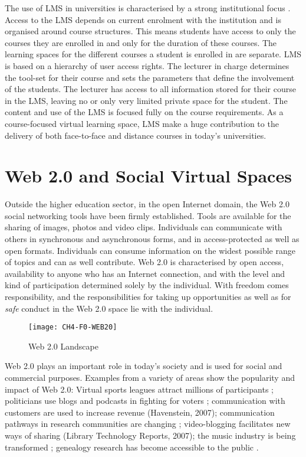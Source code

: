 The use of LMS in universities is characterised by a strong institutional focus
\citep{Siemens2004}. Access to the LMS depends on current enrolment with the
institution and is organised around course structures. This means students have
access to only the courses they are enrolled in and only for the duration of
these courses. The learning spaces for the different courses a student is
enrolled in are separate. LMS is based on a hierarchy of user access rights. The
lecturer in charge determines the tool-set for their course and sets the
parameters that define the involvement of the students. The lecturer has access
to all information stored for their course in the LMS, leaving no or only very
limited private space for the student. The content and use of the LMS is focused
fully on the course requirements. As a course-focused virtual learning space,
LMS make a huge contribution to the delivery of both face-to-face and distance
courses in today's universities.

\section{Web 2.0 and Social Virtual Spaces}
Outside the higher education sector, in the open Internet domain, the Web 2.0
social networking tools have been firmly established. Tools are available for
the sharing of images, photos and video clips. Individuals can communicate with
others in synchronous and asynchronous forms, and in access-protected as well as
open formats. Individuals can consume information on the widest possible range
of topics and can as well contribute. Web 2.0 is characterised by open access,
availability to anyone who has an Internet connection, and with the level and
kind of participation determined solely by the individual. With freedom comes
responsibility, and the responsibilities for taking up opportunities as well as
for \textit{safe} conduct in the Web 2.0 space lie with the individual.

\begin{figure}[htb]
\centering
\texttt{[image: CH4-F0-WEB20]}
\caption[Web 2.0 Landscape]{Web 2.0 Landscape \citep{Dawson2007}}
\label{fig:web20l}
\end{figure}

Web 2.0 plays an important role in today's society and is used for social and
commercial purposes. Examples from a variety of areas show the popularity and
impact of Web 2.0: Virtual sports leagues attract millions of participants
\citep{Holahan2006}; politicians use blogs and podcasts in fighting for
voters \citep{Capell2006}; communication with customers are used to increase
revenue (Havenstein, 2007); communication pathways in research communities are
changing \citep{Ashling2007}; video-blogging facilitates new ways of sharing
(Library Technology Reports, 2007); the music industry is being transformed
\citep{Holahan2007}; genealogy research has become accessible to the public
\citep{MacMillan2007}.

